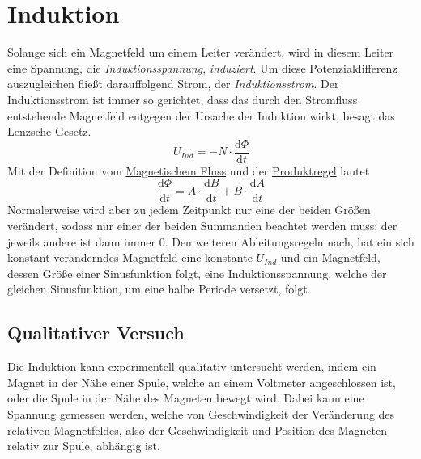\documentclass{article}
\begin{document}
 
\newcommand{\derive}[2]{\frac{\mathrm{d}#1}{\mathrm{d}#2}} 
 
\section{Induktion}  
Solange sich ein Magnetfeld um einem Leiter verändert, wird in diesem Leiter eine Spannung, die \emph{Induktionsspannung}, \emph{induziert}. \newline
Um diese Potenzialdifferenz auszugleichen fließt darauffolgend Strom, der \emph{Induktionsstrom}. Der Induktionsstrom ist immer so gerichtet, dass das  durch den Stromfluss entstehende Magnetfeld entgegen der Ursache der Induktion wirkt, besagt das Lenzsche Gesetz. 
\[
 U_{Ind} = -N \cdot \derive{\Phi}{t}
\] 
Mit der Definition vom \hyperref[Magnetischer Fluss]{Magnetischem Fluss} und der \hyperref[Ableitungsregeln]{Produktregel} lautet
\[
 \derive{\Phi}{t} = A \cdot \derive{B}{t} + B \cdot \derive{A}{t} 
\] 
Normalerweise wird aber zu jedem Zeitpunkt nur eine der beiden Größen verändert, sodass nur einer der beiden Summanden beachtet werden muss; der jeweils andere ist dann immer $0$.
Den weiteren Ableitungsregeln nach, hat ein sich konstant veränderndes Magnetfeld eine konstante $U_{Ind}$ und ein Magnetfeld, dessen Größe einer Sinusfunktion folgt, eine Induktionsspannung, welche der gleichen Sinusfunktion, um eine halbe Periode versetzt, folgt. 
 
\subsection{Qualitativer Versuch}
Die Induktion kann experimentell qualitativ untersucht werden, indem ein Magnet in der Nähe einer Spule, welche an einem Voltmeter angeschlossen ist, oder die Spule in der Nähe des Magneten bewegt wird. Dabei kann eine Spannung gemessen werden, welche von Geschwindigkeit der Veränderung des relativen Magnetfeldes, also der Geschwindigkeit und Position des Magneten relativ zur Spule, abhängig ist.
\end{document}
